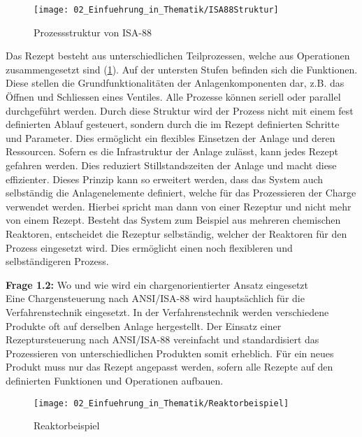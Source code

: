 		\begin{figure}[h!]
			\centering
			\texttt{[image: 02\_Einfuehrung\_in\_Thematik/ISA88Struktur]}
			\captionsetup{justification=centering}
			\caption{Prozessstruktur von ISA-88}
			\label{fig:Prozessstruktur_ISA88}
		\end{figure}
		
		Das Rezept besteht aus unterschiedlichen Teilprozessen, welche aus Operationen zusammengesetzt sind (\ref{fig:Prozessstruktur_ISA88}). Auf der untersten Stufen befinden sich die Funktionen. Diese stellen die Grundfunktionalitäten der Anlagenkomponenten dar, z.B. das Öffnen und Schliessen eines Ventiles. Alle Prozesse können seriell oder parallel durchgeführt werden. Durch diese Struktur wird der Prozess nicht mit einem fest definierten Ablauf gesteuert, sondern durch die im Rezept definierten Schritte und Parameter. Dies ermöglicht ein flexibles Einsetzen der Anlage und deren Ressourcen. Sofern es die Infrastruktur der Anlage zulässt, kann jedes Rezept gefahren werden. Dies reduziert Stillstandszeiten der Anlage und macht diese effizienter. Dieses Prinzip kann so erweitert werden, dass das System auch selbständig die Anlagenelemente definiert, welche für das Prozessieren der Charge verwendet werden. Hierbei spricht man dann von einer Rezeptur und nicht mehr von einem Rezept. Besteht das System zum Beispiel aus mehreren chemischen Reaktoren, entscheidet die Rezeptur selbständig, welcher der Reaktoren für den Prozess eingesetzt wird. Dies ermöglicht einen noch flexibleren und selbständigeren Prozess.
		
	\vspace{3mm}
	
	\textbf{Frage 1.2:} Wo und wie wird ein chargenorientierter Ansatz eingesetzt \vspace{2mm} 
	\\
		Eine Chargensteuerung nach ANSI/ISA-88 wird hauptsächlich für die Verfahrenstechnik eingesetzt. In der Verfahrenstechnik werden verschiedene Produkte oft auf derselben Anlage hergestellt. Der Einsatz einer Rezeptursteuerung nach ANSI/ISA-88 vereinfacht und standardisiert das Prozessieren von unterschiedlichen Produkten somit erheblich. Für ein neues Produkt muss nur das Rezept angepasst werden, sofern alle Rezepte auf den definierten Funktionen und Operationen aufbauen. 
		
		\begin{figure}[h!]
			\centering
			\texttt{[image: 02\_Einfuehrung\_in\_Thematik/Reaktorbeispiel]}
			\captionsetup{justification=centering}
			\caption{Reaktorbeispiel}
			\label{fig:Reaktorbeispiel}
		\end{figure}
		
